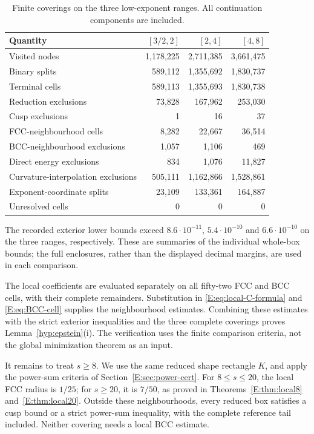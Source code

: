\documentclass[reqno,english]{amsart}
\theoremstyle{definition}
\newtheorem{open problem}[theorem]{Open Problem}
\theoremstyle{remark}
\theoremstyle{plain}
\numberwithin{equation}{section}
\begin{document}
\begin{table}[ht]\centering
\caption{Finite coverings on the three low-exponent ranges. All continuation components are included.}\label{E:tab:low-trees}
\begin{tabular}{lrrr}\toprule
Quantity&$[3/2,2]$&$[2,4]$&$[4,8]$\\\midrule
Visited nodes&1,178,225&2,711,385&3,661,475\\
Binary splits&589,112&1,355,692&1,830,737\\
Terminal cells&589,113&1,355,693&1,830,738\\
Reduction exclusions&73,828&167,962&253,030\\
Cusp exclusions&1&16&37\\
FCC-neighbourhood cells&8,282&22,667&36,514\\
BCC-neighbourhood exclusions&1,057&1,106&469\\
Direct energy exclusions&834&1,076&11,827\\
Curvature-interpolation exclusions&505,111&1,162,866&1,528,861\\
Exponent-coordinate splits&23,109&133,361&164,887\\
Unresolved cells&0&0&0\\
\bottomrule\end{tabular}
\end{table}

The recorded exterior lower bounds exceed $8.6\cdot10^{-11}$,
$5.4\cdot10^{-10}$ and $6.6\cdot10^{-10}$ on the three ranges,
respectively. These are summaries of the individual whole-box bounds;
the full enclosures, rather than the displayed decimal margins, are
used in each comparison.

The local coefficients are evaluated separately on all fifty-two FCC
and BCC cells, with their complete remainders. Substitution in
\eqref{E:eq:local-C-formula} and \eqref{E:eq:BCC-cell} supplies the
neighbourhood estimates. Combining these estimates with the strict
exterior inequalities and the three complete coverings proves
Lemma~\ref{hyp:epstein}\textup{(i)}. The verification uses the finite
comparison criteria, not the global minimization theorem as an input.

It remains to treat $s\ge8$. We use the same reduced shape rectangle
$K$, and apply the power-sum criteria of
Section~\ref{E:sec:power-cert}. For $8\le s\le20$, the local FCC
radius is $1/25$; for $s\ge20$, it is $7/50$, as proved in
Theorems~\ref{E:thm:local8} and~\ref{E:thm:local20}.
Outside these neighbourhoods, every reduced box satisfies a cusp bound
or a strict power-sum inequality, with the complete reference tail
included. Neither covering needs a local BCC estimate.
\end{document}

